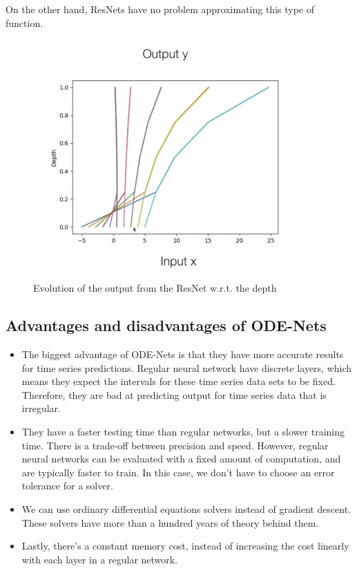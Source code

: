\documentclass[10pt,a4paper]{article}
\theoremstyle{definition}
\theoremstyle{definition}
\theoremstyle{definition}
\begin{document}
On the other hand, ResNets have no problem approximating this type of function.

\begin{figure}[!h]
\center
\includegraphics[scale=0.45]{x2gres.png}
\caption{Evolution of the output from the ResNet w.r.t. the depth}
\end{figure}

\subsection{Advantages and disadvantages of ODE-Nets}


\begin{itemize}
\item The biggest advantage of ODE-Nets is that they have more accurate results for time series predictions. Regular neural network have discrete layers, which means they expect the intervals for these time series data sets to be fixed. Therefore, they are bad at predicting output for time series data that is irregular.
\item They have a faster testing time than regular networks, but a slower training time. There is a trade-off between precision and speed. However, regular neural networks can be evaluated with a fixed amount of computation, and are typically faster to train. In this case, we don't have to choose an error tolerance for a solver.
\item We can use ordinary differential equations solvers instead of gradient descent. These solvers have more than a hundred years of theory behind them.
\item Lastly, there's a constant memory cost, instead of increasing the cost linearly with each layer in a regular network.
\end{itemize}
\end{document}
